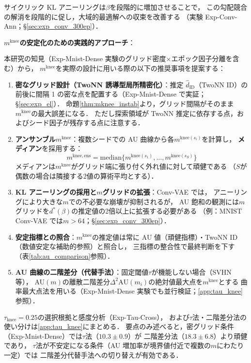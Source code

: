 \documentclass[11pt,a4paper]{jsarticle}
\newcommand{\mknee}{m^{\mathrm{knee}}}
\begin{document}
サイクリック KL アニーリング\cite{fu2019cyclical}は$\beta$を段階的に増加させることで，
この勾配競合の解消を段階的に促し，大域的最適解への収束を改善する
（実験 Exp-Conv-Ann；§\ref{sec:exp_conv_300ep}）．

\textbf{$\mknee$の安定化のための実践的アプローチ}：

本研究の知見（Exp-Mnist-Dense 実験のグリッド密度×エポック因子分離を含む）から，
$\mknee$を実際の設計に用いる際の以下の推奨事項を提案する：
\begin{enumerate}
  \item \textbf{密なグリッド設計（TwoNN 誘導型局所精密化）}：推定 $\hat{d}_\mathrm{ID}$（TwoNN ID）の
        前後に間隔 1 の密な点を配置する（Exp-Mnist-Dense で実証；§\ref{sec:exp_el}）．
        命題\ref{thm:mknee_instab}より，グリッド間隔がそのまま$\mknee$の最大誤差になる．
        ただし探索領域が TwoNN 推定に依存する点，およびシード因子が残存する点に注意する．
  \item \textbf{アンサンブル$\mknee$}：複数シードでの AU 曲線から各$m^{\mathrm{knee}(s_i)}$を計算し，
        \textbf{メディアン}を採用する：
        \begin{equation}
          m^{\mathrm{knee,ens}} = \mathrm{median}\bigl\{m^{\mathrm{knee}(s_1)}, \ldots, m^{\mathrm{knee}(s_S)}\bigr\}
          \label{eq:mknee_ens}
        \end{equation}
        メディアンは$\mknee$がグリッド端に張り付く外れ値に対して頑健である
        （$S$が偶数の場合は隣接する2値の算術平均とする）．
  \item \textbf{KL アニーリングの採用と$m$グリッドの拡張}：Conv-VAE では，
        アニーリングにより大きな$m$での不必要な崩壊が抑制されるが，
        AU 飽和の観測には$m$グリッドを$d^*(\beta)$の推定値の2倍以上に拡張する必要がある
        （例：MNIST Conv-VAE では$m > 64$；§\ref{sec:exp_conv_300ep}）．
  \item \textbf{安定指標との照合}：$\mknee$の推定値は常に AU 値（頑健指標）・TwoNN ID（数値安定な補助的参照）と照合し，
        三指標の整合性で最終判断を下す（表\ref{tab:au_comparison}参照）．
  \item \textbf{AU 曲線の二階差分（代替手法）}：固定閾値$\tau$が機能しない場合（SVHN 等），
        AU$(m)$の離散二階差分$\Delta^2\mathrm{AU}(m_i)$の絶対値最大点を$\mknee$とする
        曲率最大点法を用いる（Exp-Mnist-Dense 実験でも並行検証；\ref{app:tau_knee}参照）．
\end{enumerate}

$\tau_{\mathrm{knee}} = 0.25$の選択根拠と感度分析（Exp-Tau-Cross），
および$\tau$法・二階差分法の使い分けは\ref{app:tau_knee}にまとめる．
要点のみ述べると，密グリッド条件（Exp-Mnist-Dense）では$\tau$法（$10.3 \pm 0.9$）が
二階差分法（$18.3 \pm 6.8$）より頑健であり，
$\tau$法が不安定になる条件（AU 増加率が境界値付近で複数の$m$にわたり一定）では
二階差分代替手法への切り替えが有効である．
\end{document}
